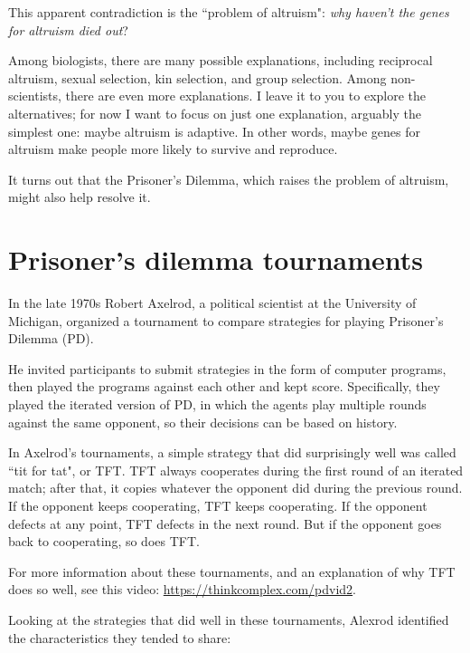 \documentclass[12pt]{book}
\theoremstyle{exercise}
\begin{document}
This apparent contradiction is the ``problem of altruism": {\em why haven't the genes for altruism died out}?


Among biologists, there are many possible explanations, including reciprocal altruism, sexual selection, kin selection, and group selection.  Among non-scientists, there are even more explanations.  I leave it to you to explore the alternatives; for now I want to focus on just one explanation, arguably the simplest one: maybe altruism is adaptive.  In other words, maybe genes for altruism make people more likely to survive and reproduce.

It turns out that the Prisoner's Dilemma, which raises the problem of altruism, might also help resolve it.


\section{Prisoner's dilemma tournaments}

In the late 1970s Robert Axelrod, a political scientist at the University of Michigan, organized a tournament to compare strategies for playing Prisoner's Dilemma (PD).


He invited participants to submit strategies in the form of computer programs, then played the programs against each other and kept score.  Specifically, they played the iterated version of PD, in which the agents play multiple rounds against the same opponent, so their decisions can be based on history.

In Axelrod's tournaments, a simple strategy that did surprisingly well was called ``tit for tat", or TFT.  TFT always cooperates during the first round of an iterated match; after that, it copies whatever the opponent did during the previous round.  If the opponent keeps cooperating, TFT keeps cooperating.  If the opponent defects at any point, TFT defects in the next round.  But if the opponent goes back to cooperating, so does TFT.


For more information about these tournaments, and an explanation of why TFT does so well, see this video: \url{https://thinkcomplex.com/pdvid2}.

Looking at the strategies that did well in these tournaments, Alexrod identified the characteristics they tended to share:
\end{document}
